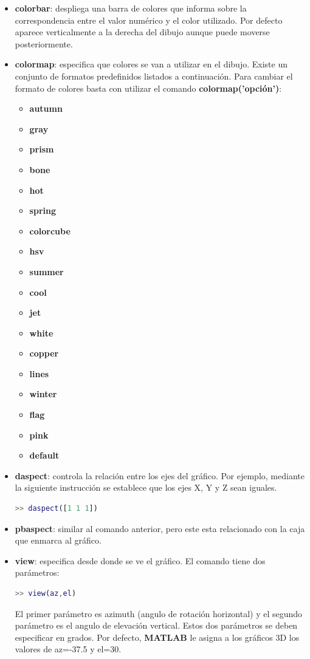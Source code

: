 \begin{itemize}
\item \textbf{colorbar}: despliega una barra de colores que informa sobre la correspondencia entre el valor numérico y el color utilizado. Por defecto aparece verticalmente a la derecha del dibujo aunque puede moverse posteriormente.
\item \textbf{colormap}: especifica que colores se van a utilizar en el dibujo. Existe un conjunto de formatos predefinidos listados a continuación. Para cambiar el formato de colores basta con utilizar el comando \textbf{colormap('opción')}:
\begin{itemize}
\item \textbf{autumn}
\item \textbf{gray}
\item \textbf{prism}
\item \textbf{bone}
\item \textbf{hot}
\item \textbf{spring}
\item \textbf{colorcube}
\item \textbf{hsv}
\item \textbf{summer}
\item \textbf{cool}
\item \textbf{jet}
\item \textbf{white}
\item \textbf{copper}
\item \textbf{lines}
\item \textbf{winter}
\item \textbf{flag}
\item \textbf{pink}
\item \textbf{default}
\end{itemize}

\item \textbf{daspect}: controla la relación entre los ejes del gráfico. Por ejemplo, mediante la siguiente instrucción se establece que los ejes X, Y y Z sean iguales. 
\begin{lstlisting}[language=Matlab]
>> daspect([1 1 1])
\end{lstlisting}

\item \textbf{pbaspect}: similar al comando anterior, pero este esta relacionado con la caja que enmarca al gráfico.
\item \textbf{view}: especifica desde donde se ve el gráfico. El comando tiene dos parámetros:
\begin{lstlisting}[language=Matlab]
>> view(az,el)
\end{lstlisting}
El primer parámetro es azimuth (angulo de rotación horizontal) y el segundo parámetro es el angulo de elevación vertical. Estos dos parámetros se deben especificar en grados. Por defecto, \textbf{MATLAB} le asigna a los gráficos 3D los valores de az=-37.5 y el=30.
\end{itemize}

